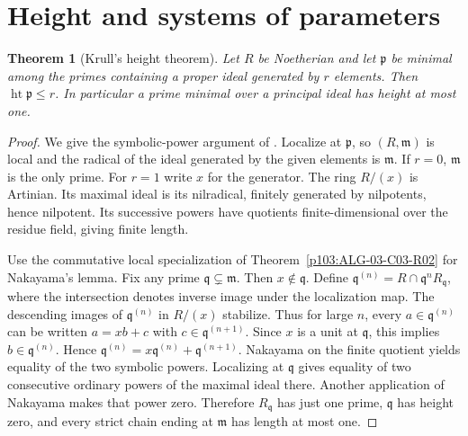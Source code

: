 \documentclass[11pt,oneside,openany]{book}
\newtheorem{theorem}{Theorem}[chapter]
\theoremstyle{definition}
\theoremstyle{remark}
\begin{document}
\section{Height and systems of parameters}

\begin{theorem}[Krull's height theorem]\label{p103:ALG-05-C03-R01}
Let \(R\) be Noetherian and let \(\mathfrak p\) be minimal among the primes containing a proper ideal generated by \(r\) elements. Then \(\operatorname{ht}\mathfrak p\le r\). In particular a prime minimal over a principal ideal has height at most one.
\end{theorem}
\begin{proof}
We give the symbolic-power argument of \cite[Theorems 10.1--10.2]{eisenbud}. Localize at \(\mathfrak p\), so \((R,\mathfrak m)\) is local and the radical of the ideal generated by the given elements is \(\mathfrak m\). If \(r=0\), \(\mathfrak m\) is the only prime. For \(r=1\) write \(x\) for the generator. The ring \(R/(x)\) is Artinian. Its maximal ideal is its nilradical, finitely generated by nilpotents, hence nilpotent. Its successive powers have quotients finite-dimensional over the residue field, giving finite length.

Use the commutative local specialization of Theorem~\ref{p103:ALG-03-C03-R02} for Nakayama's lemma. Fix any prime \(\mathfrak q\subsetneq\mathfrak m\). Then \(x\notin\mathfrak q\). Define \(\mathfrak q^{(n)}=R\cap \mathfrak q^nR_{\mathfrak q}\), where the intersection denotes inverse image under the localization map. The descending images of \(\mathfrak q^{(n)}\) in \(R/(x)\) stabilize. Thus for large \(n\), every \(a\in\mathfrak q^{(n)}\) can be written \(a=xb+c\) with \(c\in\mathfrak q^{(n+1)}\). Since \(x\) is a unit at \(\mathfrak q\), this implies \(b\in\mathfrak q^{(n)}\). Hence
\(\mathfrak q^{(n)}=x\mathfrak q^{(n)}+\mathfrak q^{(n+1)}\).
Nakayama on the finite quotient yields equality of the two symbolic powers. Localizing at \(\mathfrak q\) gives equality of two consecutive ordinary powers of the maximal ideal there. Another application of Nakayama makes that power zero. Therefore \(R_{\mathfrak q}\) has just one prime, \(\mathfrak q\) has height zero, and every strict chain ending at \(\mathfrak m\) has length at most one.


\end{proof}
\end{document}
